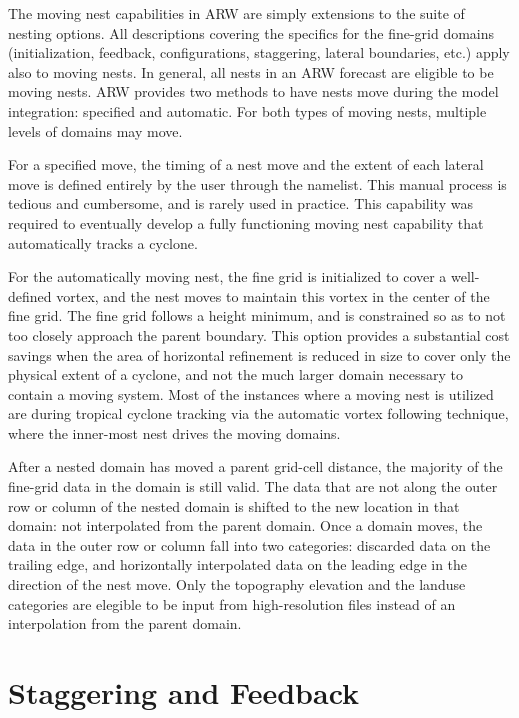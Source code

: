 The moving nest capabilities in ARW are simply extensions to the 
suite of nesting options.  All descriptions covering the 
specifics for the fine-grid
domains (initialization, feedback, configurations, staggering,
lateral boundaries, etc.) apply also to moving nests.  In
general, all nests
in an ARW forecast are eligible to be moving nests.  ARW
provides two methods to have nests move during the model
integration: specified and automatic.
For both types of moving nests,
multiple levels of domains may move.  

For a specified move, the timing of a nest move and the extent
of each lateral move is defined entirely by the user through
the namelist. This manual process is tedious and cumbersome, and is 
rarely used in practice. This capability was required to eventually
develop a fully functioning moving nest capability that automatically 
tracks a cyclone.  

For the
automatically moving nest, the fine grid is initialized to cover
a well-defined vortex, and the nest moves to maintain this vortex
in the center of the fine grid. The fine grid follows a height 
minimum, and is constrained so as to not too closely approach 
the parent boundary. This option provides a substantial cost savings
when the area of horizontal refinement is reduced in 
size to cover only the physical extent of a cyclone, and not the 
much larger domain necessary to contain a moving system.
Most of the 
instances where a moving nest is utilized are during tropical
cyclone tracking via the automatic vortex following technique,
where the inner-most nest drives the moving domains.

After a nested domain has moved a parent grid-cell distance,
the majority of the fine-grid data in the domain is still valid.  The
data that are not along the outer row or column of the nested
domain is shifted to the new location in that domain: not interpolated
from the parent domain.
Once a domain moves, the data in the outer
row or column fall into two categories: discarded data on the
trailing edge, and horizontally interpolated data on the
leading edge in the direction of the nest move. 
Only the topography elevation and the landuse categories are elegible
to be input from high-resolution files instead of an interpolation
from the parent domain.

\section{Staggering and Feedback}

